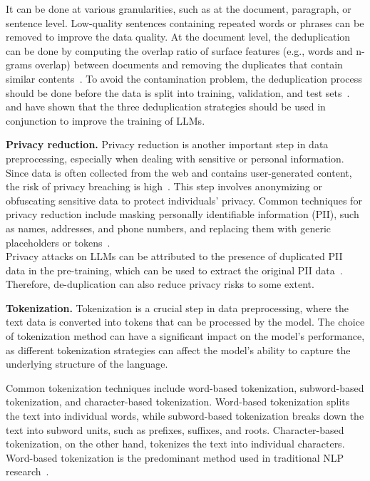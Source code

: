 It can be done at various granularities, such as at the document, paragraph, or sentence level.
Low-quality sentences containing repeated words or phrases can be removed to improve the data quality.
At the document level, the deduplication can be done by computing the overlap ratio of surface features (e.g., words and n-grams overlap) between documents and removing the duplicates that contain similar contents~\cite{touvron2023llama,rae2021scaling,workshop2023bloom,lee2022deduplicating}.
To avoid the contamination problem, the deduplication process should be done before the data is split into training, validation, and test sets~\cite{chowdhery2022palm}.
\textcite{chowdhery2022palm} and \textcite{carlini2022quantifying} have shown that the three deduplication strategies should be used in conjunction to improve the training of LLMs.

\textbf{Privacy reduction.}
Privacy reduction is another important step in data preprocessing, especially when dealing with sensitive or personal information.
Since data is often collected from the web and contains user-generated content, the risk of privacy breaching is high~\cite{carlini2021extracting}.
This step involves anonymizing or obfuscating sensitive data to protect individuals' privacy.
Common techniques for privacy reduction include masking personally identifiable information (PII), such as names, addresses, and phone numbers, and replacing them with generic placeholders or tokens~\cite{laurencon2022bigscience}.\\
Privacy attacks on LLMs can be attributed to the presence of duplicated PII data in the pre-training, which can be used to extract the original PII data~\cite{lee2022deduplicating}.
Therefore, de-duplication can also reduce privacy risks to some extent.

\textbf{Tokenization.}
Tokenization is a crucial step in data preprocessing, where the text data is converted into tokens that can be processed by the model.
The choice of tokenization method can have a significant impact on the model's performance, as different tokenization strategies can affect the model's ability to capture the underlying structure of the language.

Common tokenization techniques include word-based tokenization, subword-based tokenization, and character-based tokenization.
Word-based tokenization splits the text into individual words, while subword-based tokenization breaks down the text into subword units, such as prefixes, suffixes, and roots.
Character-based tokenization, on the other hand, tokenizes the text into individual characters.
Word-based tokenization is the predominant method used in traditional NLP research~\cite{lafferty2001conditional}.

